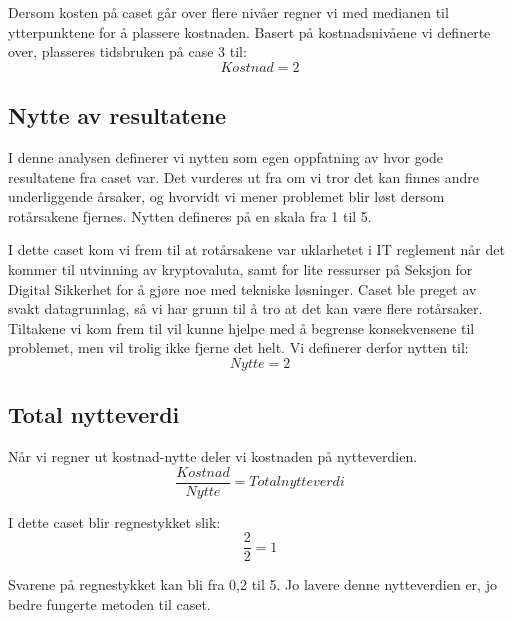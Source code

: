 Dersom kosten på caset går over flere nivåer regner vi med medianen til ytterpunktene for å plassere kostnaden. Basert på kostnadsnivåene vi definerte over, plasseres tidsbruken på case 3 til:
\[Kostnad = 2\]

\subsection{Nytte av resultatene}
I denne analysen definerer vi nytten som egen oppfatning av hvor gode resultatene fra caset var. Det vurderes ut fra om vi tror det kan finnes andre underliggende årsaker, og hvorvidt vi mener problemet blir løst dersom rotårsakene fjernes. Nytten defineres på en skala fra 1 til 5. 

I dette caset kom vi frem til at rotårsakene var uklarhetet i IT reglement når det kommer til utvinning av kryptovaluta, samt for lite ressurser på Seksjon for Digital Sikkerhet for å gjøre noe med tekniske løsninger. Caset ble preget av svakt datagrunnlag, så vi har grunn til å tro at det kan være flere rotårsaker. Tiltakene vi kom frem til vil kunne hjelpe med å begrense konsekvensene til problemet, men vil trolig ikke fjerne det helt. Vi definerer derfor nytten til:
\[Nytte = 2\]

\subsection{Total nytteverdi}
Når vi regner ut kostnad-nytte deler vi kostnaden på nytteverdien. 
\[\frac{Kostnad}{Nytte} = Total nytteverdi\]

I dette caset blir regnestykket slik:
\[\frac{2}{2} = 1\]

Svarene på regnestykket kan bli fra 0,2 til 5. Jo lavere denne nytteverdien er, jo bedre fungerte metoden til caset. 